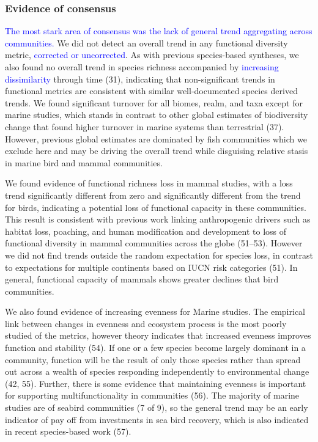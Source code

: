 \documentclass{article}
\begin{document}
\hypertarget{evidence-of-consensus}{%
\subsubsection{Evidence of consensus}\label{evidence-of-consensus}}

\textcolor{blue}{The most stark area of consensus was the lack of general trend aggregating across communities.}
We did not detect an overall trend in any functional diversity metric,
\textcolor{blue}{corrected or uncorrected}. As with previous
species-based syntheses, we also found no overall trend in species
richness accompanied by \textcolor{blue}{increasing dissimilarity}
through time (31), indicating that non-significant trends in functional
metrics are consistent with similar well-documented species derived
trends. We found significant turnover for all biomes, realm, and taxa
except for marine studies, which stands in contrast to other global
estimates of biodiversity change that found higher turnover in marine
systems than terrestrial (37). However, previous global estimates are
dominated by fish communities which we exclude here and may be driving
the overall trend while disguising relative stasis in marine bird and
mammal communities.

We found evidence of functional richness loss in mammal studies, with a
loss trend significantly different from zero and significantly different
from the trend for birds, indicating a potential loss of functional
capacity in these communities. This result is consistent with previous
work linking anthropogenic drivers such as habitat loss, poaching, and
human modification and development to loss of functional diversity in
mammal communities across the globe (51--53). However we did not find
trends outside the random expectation for species loss, in contrast to
expectations for multiple continents based on IUCN risk categories (51).
In general, functional capacity of mammals shows greater declines that
bird communities.

We also found evidence of increasing evenness for Marine studies. The
empirical link between changes in evenness and ecosystem process is the
most poorly studied of the metrics, however theory indicates that
increased evenness improves function and stability (54). If one or a few
species become largely dominant in a community, function will be the
result of only those species rather than spread out across a wealth of
species responding independently to environmental change (42, 55).
Further, there is some evidence that maintaining evenness is important
for supporting multifunctionality in communities (56). The majority of
marine studies are of seabird communities (7 of 9), so the general trend
may be an early indicator of pay off from investments in sea bird
recovery, which is also indicated in recent species-based work (57).
\end{document}
